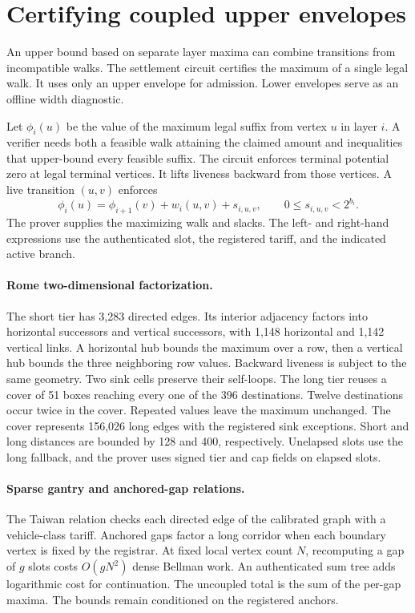 \section{Certifying coupled upper envelopes}
\label{sec:bellman}



An upper bound based on separate layer maxima can combine transitions from incompatible walks. The settlement circuit certifies the maximum of a single legal walk. It uses only an upper envelope for admission. Lower envelopes serve as an offline width diagnostic.

Let $\phi_i(u)$ be the value of the maximum legal suffix from vertex $u$ in layer $i$. A verifier needs both a feasible walk attaining the claimed amount and inequalities that upper-bound every feasible suffix. The circuit enforces terminal potential zero at legal terminal vertices. It lifts liveness backward from those vertices. A live transition $(u,v)$ enforces
\begin{equation}
\label{eq:bellman}
\phi_i(u)=\phi_{i+1}(v)+w_i(u,v)+s_{i,u,v},\qquad
0\le s_{i,u,v}<2^{b_i}.
\end{equation}
The prover supplies the maximizing walk and slacks. The left- and right-hand expressions use the authenticated slot, the registered tariff, and the indicated active branch.

\paragraph{Rome two-dimensional factorization.}
The short tier has 3,283 directed edges. Its interior adjacency factors into horizontal successors and vertical successors, with 1,148 horizontal and 1,142 vertical links. A horizontal hub bounds the maximum over a row, then a vertical hub bounds the three neighboring row values. Backward liveness is subject to the same geometry. Two sink cells preserve their self-loops. The long tier reuses a cover of 51 boxes reaching every one of the 396 destinations. Twelve destinations occur twice in the cover. Repeated values leave the maximum unchanged. The cover represents 156,026 long edges with the registered sink exceptions. Short and long distances are bounded by 128 and 400, respectively. Unelapsed slots use the long fallback, and the prover uses signed tier and cap fields on elapsed slots.

\paragraph{Sparse gantry and anchored-gap relations.}
The Taiwan relation checks each directed edge of the calibrated graph with a vehicle-class tariff. Anchored gaps factor a long corridor when each boundary vertex is fixed by the registrar. At fixed local vertex count $N$, recomputing a gap of $g$ slots costs $O(gN^2)$ dense Bellman work. An authenticated sum tree adds logarithmic cost for continuation. The uncoupled total is the sum of the per-gap maxima. The bounds remain conditioned on the registered anchors.


